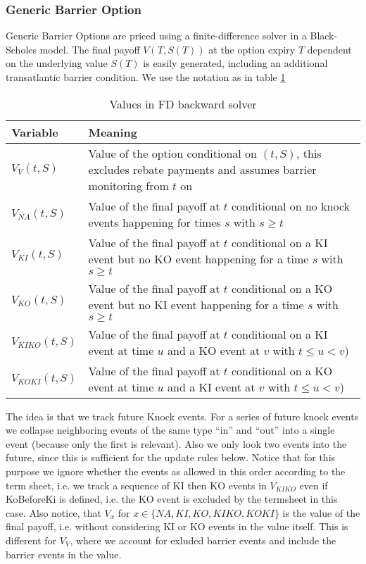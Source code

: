 \subsubsection{Generic Barrier Option}
\label{pricing:generic_barrieroption}
Generic Barrier Options are priced using a finite-difference solver in a Black-Scholes model. The final payoff $V(T,S(T))$
at the option expiry $T$ dependent on the underlying value $S(T)$ is easily generated, including an additional
transatlantic barrier condition. We use the notation as in table \ref{tab:generic_barrier_pricing_notation}

\begin{table}[h]
  \begin{tabular}{p{3cm}|p{11cm}}
    Variable & Meaning \\ \hline
    $V_{V}(t,S)$ & Value of the option conditional on $(t,S)$, this excludes rebate payments and assumes barrier monitoring from $t$ on\\ \hline
    $V_{NA}(t,S)$ & Value of the final payoff at $t$ conditional on no knock events happening for times $s$ with $s \geq t$ \\ \hline
    $V_{KI}(t,S)$ & Value of the final payoff at $t$ conditional on a KI event but no KO event happening for a time $s$ with $s \geq t$ \\ \hline
    $V_{KO}(t,S)$ & Value of the final payoff at $t$ conditional on a KO event but no KI event happening for a time $s$ with $s \geq t$ \\ \hline
    $V_{KIKO}(t,S)$ & Value of the final payoff at $t$ conditional on a KI event at time $u$ and a KO event at $v$ with $t\leq u<v$) \\ \hline
    $V_{KOKI}(t,S)$ & Value of the final payoff at $t$ conditional on a KO event at time $u$ and a KI event at $v$ with $t\leq u<v$) \\ \hline
  \end{tabular}
  \caption{Values in FD backward solver}
  \label{tab:generic_barrier_pricing_notation}
\end{table}

The idea is that we track future Knock events. For a series of future knock events we collapse neighboring events of the
same type ``in'' and ``out'' into a single event (because only the first is relevant). Also we only look two events into
the future, since this is sufficient for the update rules below. Notice that for this purpose we ignore whether the
events as allowed in this order according to the term sheet, i.e. we track a sequence of KI then KO events in $V_{KIKO}$
even if KoBeforeKi is defined, i.e. the KO event is excluded by the termsheet in this case. Also notice, that $V_{x}$
for $x \in \{ NA, KI, KO, KIKO, KOKI \}$ is the value of the final payoff, i.e. without considering KI or KO events in
the value itself. This is different for $V_{V}$, where we account for exluded barrier events and include the barrier
events in the value.

